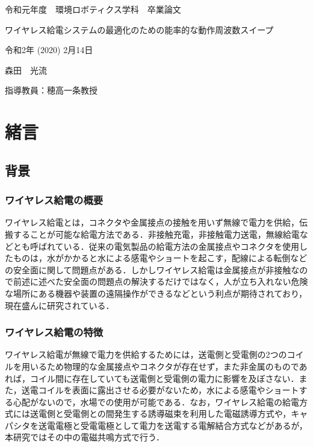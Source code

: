\documentclass[12pt]{jarticle}
\begin{document}
	
\thispagestyle{empty}

\vspace*{20mm}
\begin{center}
	{\Large 令和元年度　環境ロボティクス学科　卒業論文}
\end{center}
\vspace{10mm}
\begin{center}
	{\Huge ワイヤレス給電システムの最適化のための能率的な動作周波数スイープ}
\end{center}
\vspace{90mm}
\begin{center}
	{\Large 令和2年 (2020) 2月14日}
\end{center}
\begin{center}
	{\Large 森田　光流}
\end{center}
\begin{center}
	{\Large 指導教員：穂高一条教授}
\end{center}

\clearpage

\tableofcontents

\clearpage

\section{緒言}
\subsection{背景}
\subsubsection{ワイヤレス給電の概要}
ワイヤレス給電とは，コネクタや金属接点の接触を用いず無線で電力を供給，伝搬することが可能な給電方法である．非接触充電，非接触電力送電，無線給電などとも呼ばれている．従来の電気製品の給電方法の金属接点やコネクタを使用したものは，水がかかると水による感電やショートを起こす，配線による転倒などの安全面に関して問題点がある．しかしワイヤレス給電は金属接点が非接触なので前述に述べた安全面の問題点の解決するだけではなく，人が立ち入れない危険な場所にある機器や装置の遠隔操作ができるなどという利点が期待されており，現在盛んに研究されている．
\subsubsection{ワイヤレス給電の特徴}
ワイヤレス給電が無線で電力を供給するためには，送電側と受電側の2つのコイルを用いるため物理的な金属接点やコネクタが存在せず，また非金属のものであれば，コイル間に存在していても送電側と受電側の電力に影響を及ぼさない．また，送電コイルを表面に露出させる必要がないため，水による感電やショートする心配がないので，水場での使用が可能である．なお，ワイヤレス給電の給電方式には送電側と受電側との間発生する誘導磁束を利用した電磁誘導方式や，キャパシタを送電電極と受電電極として電力を送電する電解結合方式などがある\cite{rohm2}\cite{ito}が，本研究ではその中の電磁共鳴方式で行う．
\end{document}
